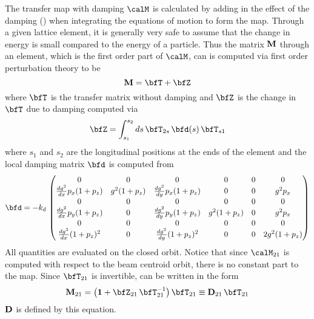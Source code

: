 The transfer map with damping $\calM$ is calculated by adding in the effect of the damping
() when integrating the equations of motion to form the map. Through a given lattice
element, it is generally very safe to assume that the change in energy is small compared to the
energy of a particle. Thus the matrix ${\bf M}$ through an element, which is the first order part of
$\calM$, can is computed via first order perturbation theory to be
\begin{equation}
  \bfM = \bfT + \bfZ
  \label{mtz}
\end{equation}
where $\bfT$ is the transfer matrix without damping and $\bfZ$ is the change in $\bfT$ due
to damping computed via
\begin{equation}
  \bfZ = \int_{s_1}^{s_2} ds \, \bfT_{2s} \, \bfd(s) \, \bfT_{s1}
  \label{zstd}
\end{equation}
where $s_1$ and $s_2$ are the longitudinal positions at the ends of the element and
the local damping matrix $\bfd$ is computed from 
\begin{equation}
  \bfd = -k_d \, \begin{pmatrix}
    0                           & 0           & 0                           & 0           & 0 & 0       \\
    \frac{dg^2}{dx} p_x (1+p_z) & g^2 (1+p_z) & \frac{dg^2}{dy} p_x (1+p_z) & 0           & 0 & g^2 p_x \\
    0                           & 0           & 0                           & 0           & 0 & 0       \\
    \frac{dg^2}{dx} p_y (1+p_z) & 0           & \frac{dg^2}{dy} p_y (1+p_z) & g^2 (1+p_z) & 0 & g^2 p_x \\
    0                           & 0           & 0                           & 0           & 0 & 0       \\
    \frac{dg^2}{dx} (1+p_z)^2   & 0           & \frac{dg^2}{dy} (1+p_z)^2   & 0           & 0 & 2 g^2 (1+p_z) \\
  \end{pmatrix}
\end{equation}
All quantities are evaluated on the closed orbit. Notice that since $\calM_{21}$ is computed with
respect to the beam centroid orbit, there is no constant part to the map. Since $\bfT_{21}$ is
invertible,  can be written in the form
\begin{equation}
  \bfM_{21} = \bigl( \boldsymbol{1} + \bfZ_{21} \, \bfT_{21}^{-1} \bigr) \, \bfT_{21} 
  \equiv \bfD_{21} \, \bfT_{21} 
\end{equation}
${\bf D}$ is defined by this equation.

